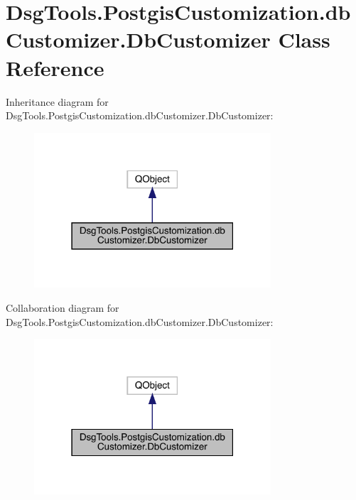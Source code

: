 \hypertarget{class_dsg_tools_1_1_postgis_customization_1_1db_customizer_1_1_db_customizer}{}\section{Dsg\+Tools.\+Postgis\+Customization.\+db\+Customizer.\+Db\+Customizer Class Reference}
\label{class_dsg_tools_1_1_postgis_customization_1_1db_customizer_1_1_db_customizer}


Inheritance diagram for Dsg\+Tools.\+Postgis\+Customization.\+db\+Customizer.\+Db\+Customizer\+:
\nopagebreak
\begin{figure}[H]
\begin{center}
\leavevmode
\includegraphics[width=250pt]{class_dsg_tools_1_1_postgis_customization_1_1db_customizer_1_1_db_customizer__inherit__graph}
\end{center}
\end{figure}


Collaboration diagram for Dsg\+Tools.\+Postgis\+Customization.\+db\+Customizer.\+Db\+Customizer\+:
\nopagebreak
\begin{figure}[H]
\begin{center}
\leavevmode
\includegraphics[width=250pt]{class_dsg_tools_1_1_postgis_customization_1_1db_customizer_1_1_db_customizer__coll__graph}
\end{center}
\end{figure}
